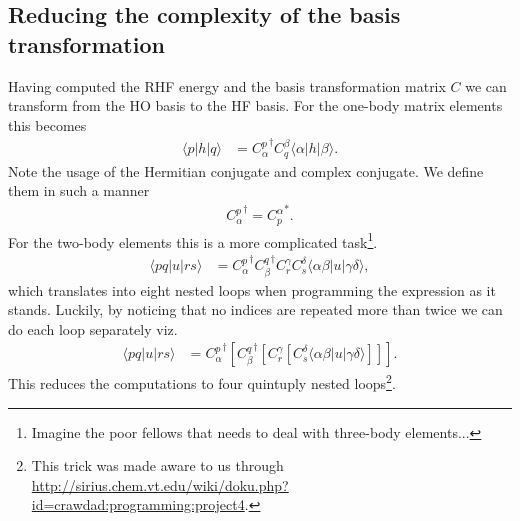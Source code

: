 \documentclass[
    a4paper, aps, twocolumn, floatfix, superscriptaddress,
    nofootinbib]{revtex4-1}
\newcommand{\1}{\mathds{1}}
\newcommand{\brak}[1]{\left[#1\right]}
\newcommand{\bra}[1]{\langle #1\lvert}
\newcommand{\ket}[1]{\rvert #1\rangle}
\begin{document}
    \subsection{Reducing the complexity of the basis transformation}
        Having computed the RHF energy and the basis transformation matrix $C$
        we can transform from the HO basis to the HF basis. For the one-body
        matrix elements this becomes
        \begin{align}
            \bra{p}h\ket{q}
            &= {C^p_{\alpha}}^{\dagger}C^{\beta}_q\bra{\alpha}h\ket{\beta}.
        \end{align}
        Note the usage of the Hermitian conjugate and complex conjugate. We
        define them in such a manner
        \begin{align}
            {C^p_{\alpha}}^{\dagger}
            = {C^{\alpha}_p}^{*}.
        \end{align}
        For the two-body elements this is a more complicated
        task\footnote{Imagine the poor fellows that needs to deal with
        three-body elements...}.
        \begin{align}
            \bra{pq}u\ket{rs}
            &=
            {C^p_{\alpha}}^{\dagger}{C^q_{\beta}}^{\dagger}
            C^{\gamma}_r C^{\delta}_s
            \bra{\alpha\beta}u\ket{\gamma\delta},
        \end{align}
        which translates into eight nested loops when programming the
        expression as it stands. Luckily, by noticing that no indices are
        repeated more than twice we can do each loop separately viz.
        \begin{align}
            \bra{pq}u\ket{rs}
            &=
            {C^p_{\alpha}}^{\dagger}
            \brak{
                {C^q_{\beta}}^{\dagger}
                \brak{
                    C^{\gamma}_r
                    \brak{
                        C^{\delta}_s
                        \bra{\alpha\beta}u\ket{\gamma\delta}
                    }
                }
            }.
        \end{align}
        This reduces the computations to four quintuply nested
        loops\footnote{This trick was made aware to us through
        \url{http://sirius.chem.vt.edu/wiki/doku.php?id=crawdad:programming:project4}.
        }.
\end{document}
